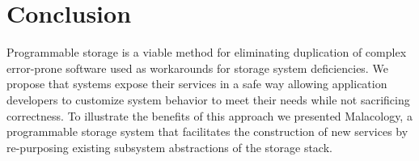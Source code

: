 \section{Conclusion}
\label{conclusion-and-future-work}

Programmable storage is a viable method for eliminating duplication of complex
error-prone software used as workarounds for storage system deficiencies. We
propose that systems expose their services in a safe way allowing application
developers to customize system behavior to meet their needs while not
sacrificing correctness. To illustrate the benefits of this approach we
presented Malacology, a programmable storage system that facilitates the
construction of new services by re-purposing existing subsystem abstractions of
the storage stack.


